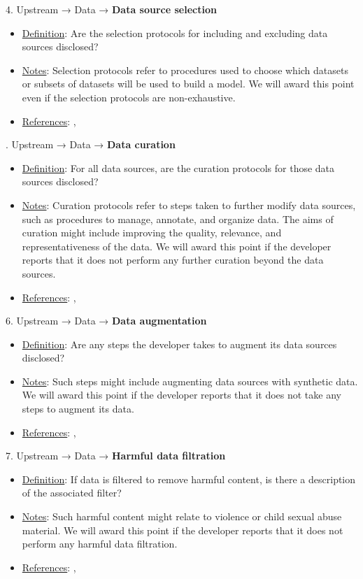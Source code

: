 4. Upstream → Data → \textbf{Data source selection}
\vspace{-\parskip}
\begin{itemize}
\item
\underline{Definition}: Are the selection protocols for including and excluding data sources disclosed?
\item
\underline{Notes}: Selection protocols refer to procedures used to choose which datasets or subsets of datasets will be used to build a model. We will award this point even if the selection protocols are non-exhaustive.
\item
\underline{References}: \citet{gebru2021datasheets}, \citet{hutchinson2021towards}
\end{itemize}


. Upstream → Data → \textbf{Data curation}
\vspace{-\parskip}
\begin{itemize}
\item
\underline{Definition}: For all data sources, are the curation protocols for those data sources disclosed?
\item
\underline{Notes}: Curation protocols refer to steps taken to further modify data sources, such as procedures to manage, annotate, and organize data. The aims of curation might include improving the quality, relevance, and representativeness of the data. We will award this point if the developer reports that it does not perform any further curation beyond the data sources.
\item
\underline{References}: \citet{gebru2021datasheets}, \citet{hutchinson2021towards}
\end{itemize}


6. Upstream → Data → \textbf{Data augmentation}
\vspace{-\parskip}
\begin{itemize}
\item
\underline{Definition}: Are any steps the developer takes to augment its data sources disclosed?
\item
\underline{Notes}: Such steps might include augmenting data sources with synthetic data. We will award this point if the developer reports that it does not take any steps to augment its data.
\item
\underline{References}: \citet{gebru2021datasheets}, \citet{hutchinson2021towards}
\end{itemize}


7. Upstream → Data → \textbf{Harmful data filtration}
\vspace{-\parskip}
\begin{itemize}
\item
\underline{Definition}: If data is filtered to remove harmful content, is there a description of the associated filter?
\item
\underline{Notes}: Such harmful content might relate to violence or child sexual abuse material. We will award this point if the developer reports that it does not perform any harmful data filtration.
\item
\underline{References}: \citet{dodge2021c4}, \citet{longpre2023pretrainer}
\end{itemize}


